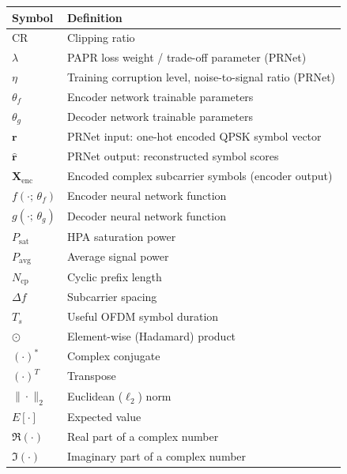 \begin{center}
\vspace{1cm}
\begin{tabular}{l l}
\toprule
    \textbf{Symbol} & \textbf{Definition} \\
\midrule
$\mathrm{CR}$          & Clipping ratio \\
$\lambda$              & PAPR loss weight / trade-off parameter (PRNet) \\
$\eta$                 & Training corruption level, noise-to-signal ratio (PRNet) \\
$\theta_f$             & Encoder network trainable parameters \\
$\theta_g$             & Decoder network trainable parameters \\
$\bm{r}$               & PRNet input: one-hot encoded QPSK symbol vector \\
$\hat{\bm{r}}$         & PRNet output: reconstructed symbol scores \\
$\bm{X}_{\mathrm{enc}}$ & Encoded complex subcarrier symbols (encoder output) \\
$f(\cdot;\,\theta_f)$  & Encoder neural network function \\
$g(\cdot;\,\theta_g)$  & Decoder neural network function \\
$P_{\mathrm{sat}}$     & HPA saturation power \\
$P_{\mathrm{avg}}$     & Average signal power \\
$N_{\mathrm{cp}}$      & Cyclic prefix length \\
$\Delta f$             & Subcarrier spacing \\
$T_s$                  & Useful OFDM symbol duration \\
$\odot$                & Element-wise (Hadamard) product \\
$(\cdot)^*$            & Complex conjugate \\
$(\cdot)^T$            & Transpose \\
$\|\cdot\|_2$          & Euclidean ($\ell_2$) norm \\
$E[\cdot]$             & Expected value \\
$\Re(\cdot)$           & Real part of a complex number \\
$\Im(\cdot)$           & Imaginary part of a complex number \\
\bottomrule
\end{tabular}
\end{center}
